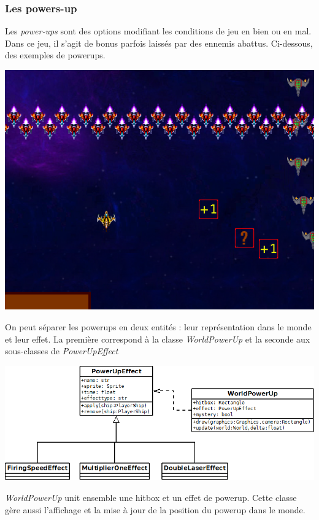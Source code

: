 \documentclass{article}
\begin{document}
\subsubsection{Les powers-up}

Les \emph{power-ups} sont des options modifiant les conditions de jeu en bien ou
en mal. Dans ce jeu, il s'agit de bonus parfois laissés par des ennemis abattus.
Ci-dessous, des exemples de powerups.

\begin{center}
\includegraphics[scale=0.8]{images/exemple_powerup.png}
\end{center}


On peut séparer les powerups en deux entités : leur représentation dans le monde
et leur effet. La première correspond à la classe \emph{WorldPowerUp} et la
seconde aux sous-classes de \emph{PowerUpEffect}

\begin{center}
\includegraphics[scale=0.5]{images/dia_powerup.png}
\end{center}

\emph{WorldPowerUp} unit ensemble une hitbox et un effet de powerup. Cette
classe gère aussi l'affichage et la mise à jour de la position du powerup dans
le monde.
\end{document}

